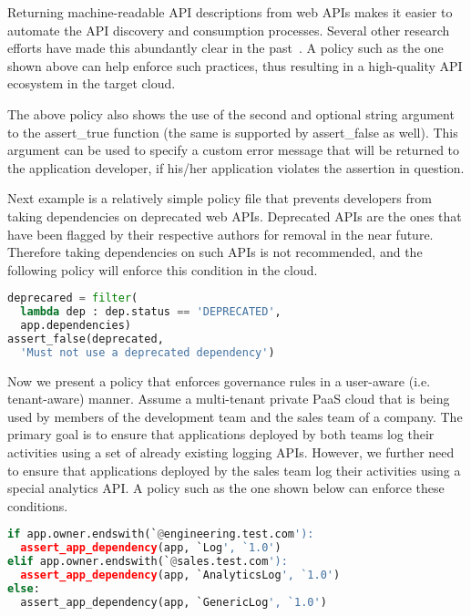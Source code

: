 Returning machine-readable API descriptions from web APIs 
makes it easier to automate the API discovery and consumption processes. Several other
research efforts have made this abundantly clear in the past~\cite{Verborgh:2012:FDB:2307819.2307828,Steiner:2011:FHC:1967428.1967433}. 
A policy such as the one
shown above can help enforce such practices, thus resulting in a high-quality
API ecosystem in the target cloud. 

The above policy also shows the use of the second and
optional string argument to the assert\_true function (the same is supported by assert\_false as well). 
This argument can be used to specify
a custom error message that will be returned to the application developer, if his/her application
violates the assertion in question.

Next example is a relatively simple policy file that prevents developers from taking
dependencies on deprecated web APIs. Deprecated APIs are the ones that have been flagged
by their respective authors for removal in the near future. Therefore taking dependencies on such
APIs is not recommended, and the following policy will enforce this condition in the cloud.

\vspace{0.05in}
{\footnotesize
\begin{lstlisting}[language=Python, frame=single, showstringspaces=false]
deprecared = filter(
  lambda dep : dep.status == 'DEPRECATED', 
  app.dependencies)
assert_false(deprecated, 
  'Must not use a deprecated dependency')
\end{lstlisting}
}
\vspace{0.05in}

Now we present a policy that enforces governance rules in a user-aware (i.e. tenant-aware) manner. Assume
a multi-tenant private PaaS cloud that is being used by members of the development
team and the sales team of a company. The primary goal is to ensure that applications deployed by both teams
log their activities using a set of already existing logging APIs. However, we further need to ensure that applications
deployed by the sales team log their activities using a special analytics API. A policy such as the one
shown below can enforce these conditions.

\vspace{0.05in}
{\footnotesize
\begin{lstlisting}[language=Python, frame=single, showstringspaces=false]
if app.owner.endswith(`@engineering.test.com'):
  assert_app_dependency(app, `Log', `1.0')
elif app.owner.endswith(`@sales.test.com'):
  assert_app_dependency(app, `AnalyticsLog', `1.0')
else:
  assert_app_dependency(app, `GenericLog', `1.0')
\end{lstlisting}
}
\vspace{0.05in} 

